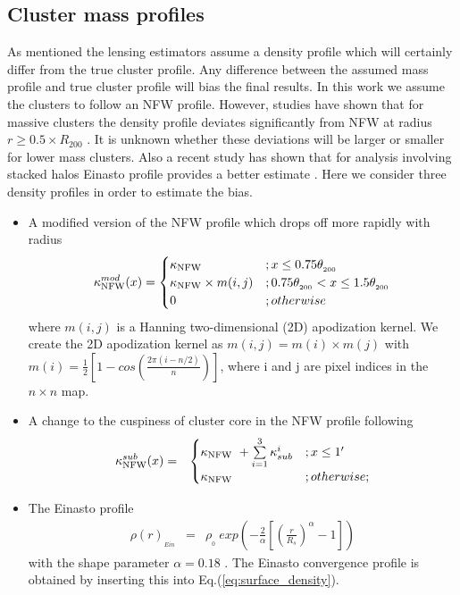 \subsection{Cluster mass profiles}
As mentioned the lensing estimators assume a density profile which will certainly differ from the true cluster profile. 
Any difference between the assumed mass profile and true cluster profile will bias the final results.
In this work we assume the clusters to follow an NFW profile. 
However, studies have shown that for massive clusters the density profile deviates significantly from NFW at radius $r \ge 0.5 \times R_{200}$ \citep{diemer14}. 
It is unknown whether these deviations will be larger or smaller for lower mass clusters.
Also a recent study has shown that for analysis involving stacked halos Einasto profile \citep{einasto89} provides a better estimate \citep{child18}.
Here we consider three density profiles in order to estimate the bias.
\begin{itemize}
\item A modified version of the NFW profile which drops off more rapidly with radius
\begin{eqnarray}
\kappa_{\rm NFW}^{mod}(x) =
\begin{cases}
    \kappa_{\rm NFW} &; x \le 0.75\theta_{_{200}}\\
    \kappa_{\rm NFW} \times m(i,j)&; 0.75\theta_{_{200}} < x \le 1.5\theta_{_{200}}\\
    0 &; otherwise
\label{eq_kappa_mod}
\end{cases}
\end{eqnarray}
where $m(i,j)$ is a Hanning two-dimensional (2D) apodization kernel.
We create the 2D apodization kernel as $m(i,j) = m(i) \times m(j)$ with $m(i) = \frac{1}{2} \left[ 1 - cos\left(\frac{2\pi  (i-n/2) }{n} \right)\right]$, where i and j are pixel indices in the $n \times n$ map.
\item A change to the cuspiness of cluster core in the NFW profile following \citet{king01} 
\begin{eqnarray}
\kappa_{\rm NFW}^{sub}(x)  & =  &
\begin{cases}
    \kappa_{\rm NFW}\ + \sum\limits_{i=1}^{3} \kappa_{sub}^{i}&; x \le 1'\\
    \kappa_{\rm NFW} &; otherwise;
\label{eq_kappa_sub}
\end{cases}
\end{eqnarray}
\item The Einasto profile \citep{einasto89}
\begin{eqnarray}
\rho(r)_{_{Ein}} & = &  \rho_{_{0}}\ exp\left( - \frac{2}{\alpha} \left[\left(\frac{r}{R_s} \right)^{\alpha} - 1\right]\right)
\label{eq_einasto_density}
\end{eqnarray}
with the shape parameter $\alpha = 0.18$ \citep{ludlow13}. The Einasto convergence profile is obtained by inserting this into Eq.(\ref{eq:surface_density}).
\end{itemize}
 
